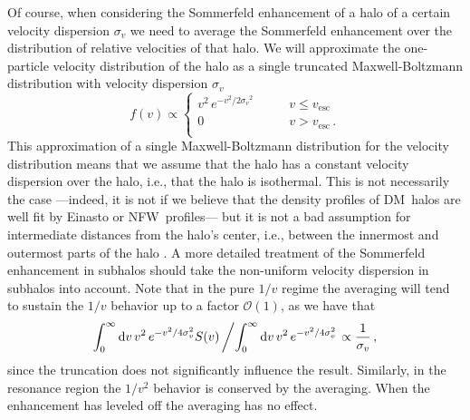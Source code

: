 \documentclass[aps,prd,twocolumn,amsmath,amssymb,floatfix,nofootinbib,10pt]{revtex4}
\newcommand{\ie}{i.e.}
\newcommand{\NFW}{NFW}
\newcommand{\DM}{DM}
\newcommand{\somm}{\ensuremath{S}}
\newcommand{\dd}{\mathrm{d}}
\newcommand{\order}{\ensuremath{\mathcal{O}}}
\newcommand{\sigv}{\ensuremath{\sigma_v}}
\begin{document}
Of course, when considering the Sommerfeld enhancement of a halo of a
certain velocity dispersion $\sigv$ we need to average the Sommerfeld
enhancement over the distribution of relative velocities of that
halo. We will approximate the one-particle velocity distribution of
the halo as a single truncated Maxwell-Boltzmann distribution with
velocity dispersion $\sigv$
\begin{equation}\label{eq:maxboltz}
f(v) \propto \left\{
\begin{array}{rl}
v^2\, e^{-v^2/2\sigv^2}  & \qquad v \leq v_{\mathrm{esc}}\\
0 & \qquad v > v_{\mathrm{esc}}\, .\\
\end{array} \right.
\end{equation}
This approximation of a single Maxwell-Boltzmann
distribution for the velocity distribution means that we assume that
the halo has a constant velocity dispersion over the halo, \ie, that
the halo is isothermal. This is not necessarily the case ---indeed, it
is not if we believe that the density profiles of \DM\ halos are well
fit by Einasto or \NFW\ profiles--- but it is not a bad assumption for
intermediate distances from the halo's center, \ie, between the
innermost and outermost parts of the halo
\cite{2007ApJ...667L..53W}. A more detailed treatment of the
Sommerfeld enhancement in subhalos should take the non-uniform
velocity dispersion in subhalos into account. Note that in the pure
$1/v$ regime the averaging will tend to sustain the $1/v$ behavior up
to a factor $\order(1)$, as we have that
\begin{equation}
\int_0^\infty \dd v \, v^2\, e^{-v^2/4\sigv^2}
\somm(v)\left/\int_0^\infty \dd v \, v^2\, e^{-v^2/4\sigv^2} \right.\propto
\frac{1}{\sigv}\, ,
\end{equation}
since the truncation does not significantly influence the
result. Similarly, in the resonance region the $1/v^2$ behavior is
conserved by the averaging. When the enhancement has leveled off the
averaging has no effect.
\end{document}
